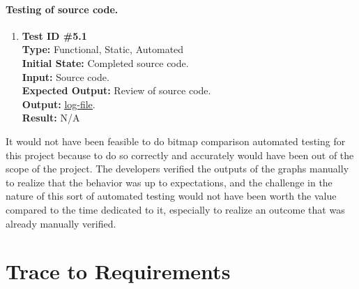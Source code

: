 \documentclass[12pt, titlepage]{article}
\begin{document}
	\paragraph{Testing of source code.}
		\begin{enumerate}
			\item{\textbf{Test ID \#5.1\\}}
			\textbf{Type:} Functional, Static, Automated\\
			\textbf{Initial State:} Completed source code. \\
			\textbf{Input:} Source code.\\
			\textbf{Expected Output:} Review of source code.\\
			\textbf{Output:}	 \href{run:code_eval.txt} {\underline{log-file}}.\\
			\textbf{Result:} N/A
		\end{enumerate}

It would not have been feasible to do bitmap comparison automated testing for this project because to do so correctly and accurately would have been out of the scope of the project. The developers verified the outputs of the graphs manually to realize that the behavior was up to expectations, and the challenge in the nature of this sort of automated testing would not have been worth the value compared to the time dedicated to it, especially to realize an outcome that was already manually verified.



\section{Trace to Requirements} %
\end{document}
